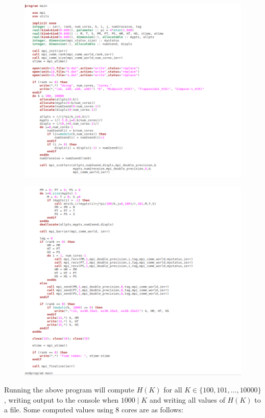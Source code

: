 \documentclass{article}
\theoremstyle{remark}
\theoremstyle{remark}
\begin{document}
	\begin{figure}[H]\centering
		\includegraphics[scale=0.4]{main1.png}
	\end{figure}
	\begin{figure}[H]\centering\vspace{-5mm}
		\includegraphics[scale=0.4]{main2.png}
	\end{figure}
	Running the above program will compute $H(K)$ for all $K\in\{100,101,\dots,10000\}$, writing output to the console when $1000\mid K$ and writing all values of $H(K)$ to a file. Some computed values using 8 cores are as follows: \par
\end{document}
